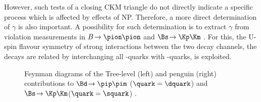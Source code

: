 However, such tests of a closing CKM triangle do not directly indicate a specific process which is affected by effects of \ac{NP}.
Therefore, a more direct determination of $\gamma$ is also important.
A possibility for such determination is to extract $\gamma$ from \CP violation measurements in $B\!\to\pion\pion$ and $\Bs\!\to\Kp\Km$ \cite{GammaInLoops_Fleischer, GammaInLoops_Ciuchini}.
For this, the U-spin flavour symmetry of strong interactions between the two decay channels, \ie the decays are related by interchanging all \dquark-quarks with \squark-quarks, is exploited.
\begin{figure}[tbp]
	\centering
	
	\hfill
	
	\caption{Feynman diagrams of the Tree-level (left) and penguin (right) contributions to $\Bd\!\to\pip\pim$ ($\quark=\dquark$) and $\Bs\!\to\Kp\Km$($\quark=\squark$) \cite{Ellis:2016jkw}.}
	\label{fig:feynmanGammaLoops}
\end{figure}

